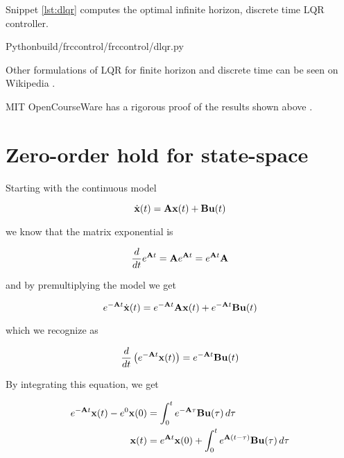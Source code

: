 Snippet \ref{lst:dlqr} computes the optimal infinite horizon, discrete time
LQR controller.

\begin{code}{Python}{build/frccontrol/frccontrol/dlqr.py}
  \caption{Infinite horizon, discrete time LQR computation in Python}
  \label{lst:dlqr}
\end{code}

Other formulations of LQR for finite horizon and discrete time can be seen on
Wikipedia \cite{bib:wiki_lqr}.

MIT OpenCourseWare has a rigorous proof of the results shown above
\cite{bib:lqr_derivs}.

\section{Zero-order hold for state-space}
\label{sec:deriv_zoh_ss}

Starting with the continuous \gls{model}

\begin{equation*}
  \dot{\mathbf{x}}(t) = \mathbf{A}\mathbf{x}(t) + \mathbf{B}\mathbf{u}(t)
\end{equation*}

we know that the matrix exponential is

\begin{equation*}
  \frac{d}{dt}e^{\mathbf{A}t} = \mathbf{A}e^{\mathbf{A}t} = e^{\mathbf{A}t}\mathbf{A}
\end{equation*}

and by premultiplying the \gls{model} we get

\begin{equation*}
  e^{-\mathbf{A}t}\dot{\mathbf{x}}(t) = e^{-\mathbf{A}t}\mathbf{A}\mathbf{x}(t) +
    e^{-\mathbf{A}t}\mathbf{B}\mathbf{u}(t)
\end{equation*}

which we recognize as

\begin{equation*}
  \frac{d}{dt}\left(e^{-\mathbf{A}t}\mathbf{x}(t)\right) =
    e^{-\mathbf{A}t}\mathbf{B}\mathbf{u}(t)
\end{equation*}

By integrating this equation, we get

\begin{align*}
  e^{-\mathbf{A}t}\mathbf{x}(t) - e^0\mathbf{x}(0) &=
    \int_0^t e^{-\mathbf{A}\tau}\mathbf{B}\mathbf{u}(\tau) \,d\tau \\
  \mathbf{x}(t) &= e^{\mathbf{A}t}\mathbf{x}(0) +
    \int_0^t e^{\mathbf{A}(t - \tau)}\mathbf{B}\mathbf{u}(\tau) \,d\tau
\end{align*}

